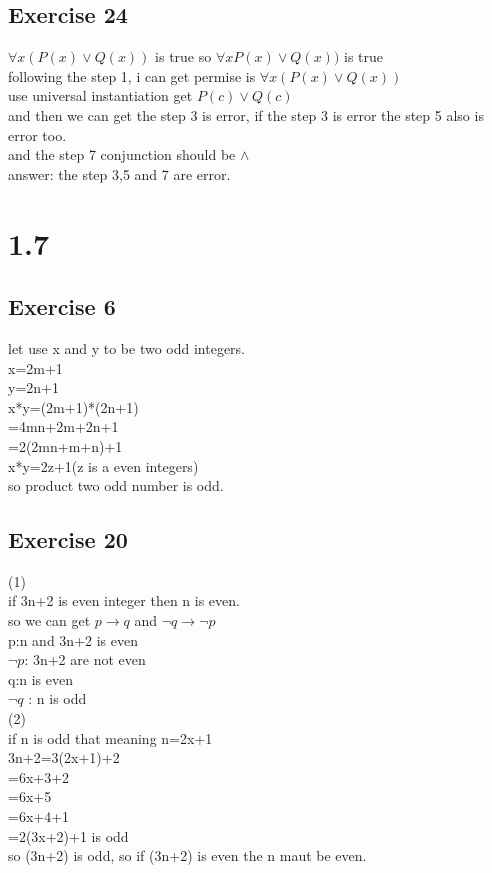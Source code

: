 \documentclass[12pt]{article}
\begin{document}
\subsection*{Exercise 24}
$\forall x(P(x)\lor Q(x))$ is true so $\forall xP(x)\lor Q(x))$ is true\\
following the step 1, i can get permise is $\forall x(P(x)\lor Q(x))$\\
use universal instantiation get $P(c)\lor Q(c)$\\
and then we can get the step 3 is error, if the step 3 is error the step 5 also is error too.\\
and the step 7 conjunction should be $\land $\\
answer: the step 3,5 and 7 are error.\\


\section*{1.7}
\subsection*{Exercise 6}
let use x and y to be two odd integers.\\
x=2m+1\\
y=2n+1\\
x*y=(2m+1)*(2n+1)\\
   =4mn+2m+2n+1\\
   =2(2mn+m+n)+1\\
x*y=2z+1(z is a even integers)\\
so product two odd number is odd.\\

\subsection*{Exercise 20}
(1)\\
if 3n+2 is even integer then n is even.\\
so we can get $p\rightarrow q$ and $\lnot q\rightarrow \lnot p$\\
p:n and 3n+2 is even\\
$\lnot p$: 3n+2 are not even\\
q:n is even\\
$\lnot q$ : n is odd\\

(2)\\
if n is odd that meaning n=2x+1\\
3n+2=3(2x+1)+2\\
    =6x+3+2\\
    =6x+5\\
    =6x+4+1\\
    =2(3x+2)+1  is odd\\
so (3n+2) is odd, so if (3n+2) is even the n maut be even.\\
\end{document}

